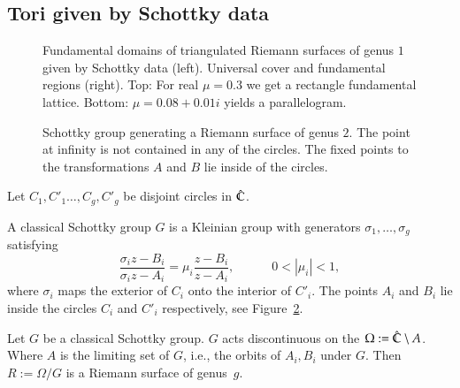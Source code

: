 \documentclass[Thesis]{subfiles}
\begin{document}
\subsection{Tori given by Schottky data}
\label{sec:tori_schottky}
\begin{figure}
\centering
{}
\caption{
Fundamental domains of triangulated Riemann surfaces of genus $1$ given by Schottky data (left). 
Universal cover and fundamental regions (right). 
Top: For real $\mu=0.3$ we get a rectangle fundamental lattice. 
Bottom: $\mu=0.08+0.01i$ yields a parallelogram.
}
\label{fig:schottky_g1}
\end{figure}

\begin{figure} 
\centering 
\scalebox{1.0}{}
\caption{
Schottky group generating a Riemann surface of genus $2$. 
The point at infinity is not contained in any of the circles. 
The fixed points to the transformations $A$ and $B$ lie inside of the circles.
} 
\label{fig:schottky_group}
\end{figure}

Let $C_1,C'_1\ldots,C_g,C'_g$ be disjoint circles in $\hat{\mathbb C}$.
\begin{definition} A classical Schottky group $G$ is a Kleinian group with generators $\sigma_1,\ldots,\sigma_g$ satisfying
\begin{equation}
\frac{\sigma_i z - B_i}{\sigma_i z - A_i} = \mu_i \frac{z - B_i}{z - A_i},
\quad\quad\quad 0 < \left|\mu_i\right|<1,
\end{equation}
where $\sigma_i$ maps the exterior of $C_i$ onto the interior of $C'_i$. The points $A_i$ and $B_i$ lie inside the circles $C_i$ and $C'_i$ respectively, see Figure~\ref{fig:schottky_group}.
\end{definition}
Let $G$ be a classical Schottky group. $G$ acts discontinuous on the $\Omega:=\hat{\mathbb C}\setminus A$. 
Where $A$ is the limiting set of $G$, i.e., the orbits of $A_i, B_i$ under $G$.
Then $R:=\Omega/G$ is a Riemann surface of genus~$g$.
\end{document}
